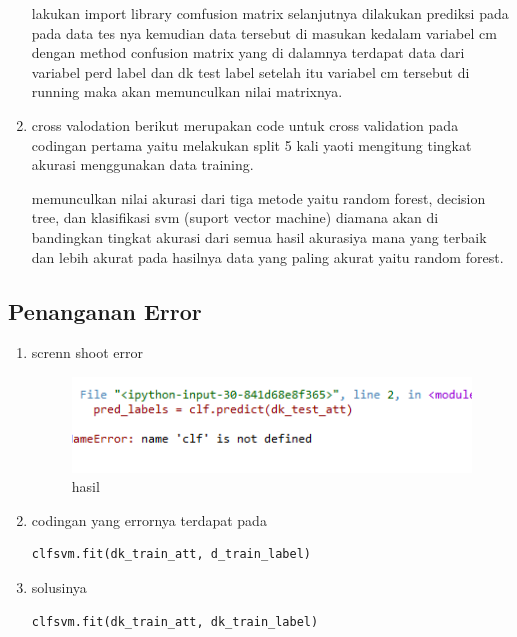 \begin{enumerate}
lakukan import library comfusion matrix selanjutnya dilakukan prediksi pada pada data tes nya kemudian data tersebut di masukan kedalam variabel cm dengan method confusion matrix yang di dalamnya terdapat data dari variabel perd label dan dk test label setelah itu variabel cm tersebut di running maka akan memunculkan nilai matrixnya. 

\item cross valodation 
berikut merupakan code untuk cross validation pada codingan pertama yaitu melakukan split 5 kali yaoti mengitung tingkat akurasi menggunakan data training.


memunculkan nilai akurasi dari tiga metode yaitu random forest, decision tree, dan klasifikasi svm (suport vector machine) diamana akan di bandingkan tingkat akurasi dari semua hasil akurasiya mana yang terbaik dan lebih akurat pada hasilnya data yang paling akurat yaitu random forest.



\end{enumerate}
\subsection{Penanganan Error}
\begin{enumerate}
\item screnn shoot error

\begin{figure}[ht]
\centering
\includegraphics[scale=0.5]{figures/1174002/4/ss4.PNG}
\caption{hasil}
\label{Error}
\end{figure}

\item codingan yang errornya terdapat pada 
\begin{verbatim}
clfsvm.fit(dk_train_att, d_train_label)
\end{verbatim}
\item solusinya
\begin{verbatim}
clfsvm.fit(dk_train_att, dk_train_label)
\end{verbatim}
\end{enumerate}
